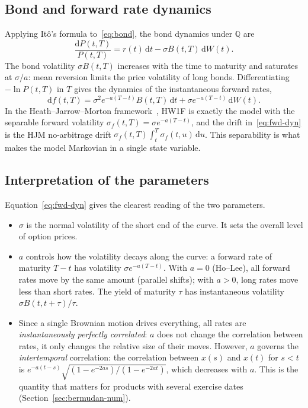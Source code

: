 \documentclass[11pt,a4paper]{article}
\theoremstyle{plain}
\theoremstyle{definition}
\newcommand{\dd}{\mathrm{d}}
\newcommand{\Q}{\mathbb{Q}}
\begin{document}
\subsection{Bond and forward rate dynamics}
Applying Itô's formula to~\eqref{eq:bond}, the bond dynamics under $\Q$ are
\begin{equation}
    \frac{\dd P(t,T)}{P(t,T)}=r(t)\,\dd t-\sigma B(t,T)\,\dd W(t).
    \label{eq:bond-dyn}
\end{equation}
The bond volatility $\sigma B(t,T)$ increases with the time to maturity and saturates at $\sigma/a$: mean reversion limits the price volatility of long bonds. Differentiating $-\ln P(t,T)$ in $T$ gives the dynamics of the instantaneous forward rates,
\begin{equation}
    \dd f(t,T)=\sigma^2e^{-a(T-t)}B(t,T)\,\dd t+\sigma e^{-a(T-t)}\,\dd W(t).
    \label{eq:fwd-dyn}
\end{equation}
In the Heath--Jarrow--Morton framework~\cite{hjm}, HW1F is exactly the model with the separable forward volatility $\sigma_f(t,T)=\sigma e^{-a(T-t)}$, and the drift in~\eqref{eq:fwd-dyn} is the HJM no-arbitrage drift $\sigma_f(t,T)\int_t^T\sigma_f(t,u)\,\dd u$. This separability is what makes the model Markovian in a single state variable.

\subsection{Interpretation of the parameters}
Equation~\eqref{eq:fwd-dyn} gives the clearest reading of the two parameters.
\begin{itemize}
    \item $\sigma$ is the normal volatility of the short end of the curve. It sets the overall level of option prices.
    \item $a$ controls how the volatility decays along the curve: a forward rate of maturity $T-t$ has volatility $\sigma e^{-a(T-t)}$. With $a=0$ (Ho--Lee), all forward rates move by the same amount (parallel shifts); with $a>0$, long rates move less than short rates. The yield of maturity $\tau$ has instantaneous volatility $\sigma B(t,t+\tau)/\tau$.
    \item Since a single Brownian motion drives everything, all rates are \emph{instantaneously perfectly correlated}: $a$ does not change the correlation between rates, it only changes the relative size of their moves. However, $a$ governs the \emph{intertemporal} correlation: the correlation between $x(s)$ and $x(t)$ for $s<t$ is $e^{-a(t-s)}\sqrt{(1-e^{-2as})/(1-e^{-2at})}$, which decreases with $a$. This is the quantity that matters for products with several exercise dates (Section~\ref{sec:bermudan-num}).
\end{itemize}
\end{document}
